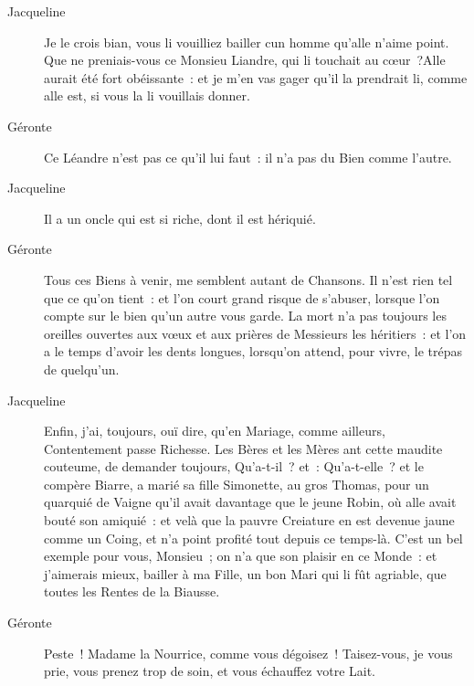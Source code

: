 \documentclass[french,twoside]{book} %
\begin{document}
 \begin{description} \item[Jacqueline] 

Je le crois bian, vous li vouilliez bailler cun homme qu’alle n’aime point. Que ne preniais-vous ce Monsieu Liandre, qui li touchait au cœur ?Alle aurait été fort obéissante : et je m’en vas gager qu’il la prendrait li, comme alle est, si vous la li vouillais donner.\end{description}
 \begin{description} \item[Géronte] 

Ce Léandre n’est pas ce qu’il lui faut : il n’a pas du Bien comme l’autre.\end{description}
 \begin{description} \item[Jacqueline] 

Il a un oncle qui est si riche, dont il est hériquié.\end{description}
 \begin{description} \item[Géronte] 

Tous ces Biens à venir, me semblent autant de Chansons. Il n’est rien tel que ce qu’on tient : et l’on court grand risque de s’abuser, lorsque l’on compte sur le bien qu’un autre vous garde. La mort n’a pas toujours les oreilles ouvertes aux vœux et aux prières de Messieurs les héritiers : et l’on a le temps d’avoir les dents longues, lorsqu’on attend, pour vivre, le trépas de quelqu’un.\end{description}
 \begin{description} \item[Jacqueline] 

Enfin, j’ai, toujours, ouï dire, qu’en Mariage, comme ailleurs, Contentement passe Richesse. Les Bères et les Mères ant cette maudite couteume, de demander toujours, Qu’a-t-il ? et : Qu’a-t-elle ? et le compère Biarre, a marié sa fille Simonette, au gros Thomas, pour un quarquié de Vaigne qu’il avait davantage que le jeune Robin, où alle avait bouté son amiquié : et velà que la pauvre Creiature en est devenue jaune comme un Coing, et n’a point profité tout depuis ce temps-là. C’est un bel exemple pour vous, Monsieu ; on n’a que son plaisir en ce Monde : et j’aimerais mieux, bailler à ma Fille, un bon Mari qui li fût agriable, que toutes les Rentes de la Biausse.\end{description}
 \begin{description} \item[Géronte] 

Peste ! Madame la Nourrice, comme vous dégoisez ! Taisez-vous, je vous prie, vous prenez trop de soin, et vous échauffez votre Lait.\end{description}
\end{document}
